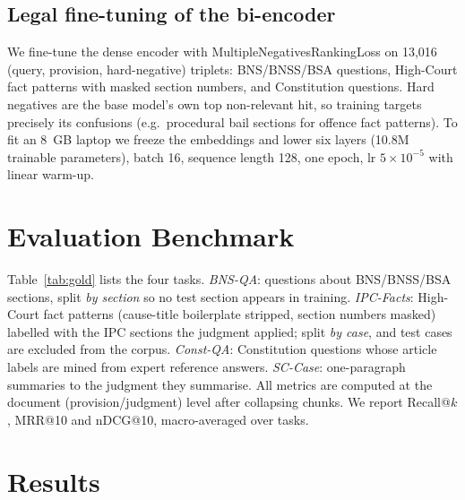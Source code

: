 \documentclass[conference]{IEEEtran}
\begin{document}
\subsection{Legal fine-tuning of the bi-encoder}
We fine-tune the dense encoder with MultipleNegativesRankingLoss on 13,016 (query, provision, hard-negative) triplets: BNS/BNSS/BSA questions, High-Court fact patterns with masked section numbers, and Constitution questions. Hard negatives are the base model's own top non-relevant hit, so training targets precisely its confusions (e.g.\ procedural bail sections for offence fact patterns). To fit an 8~GB laptop we freeze the embeddings and lower six layers (10.8M trainable parameters), batch 16, sequence length 128, one epoch, lr $5{\times}10^{-5}$ with linear warm-up.

\section{Evaluation Benchmark}
Table~\ref{tab:gold} lists the four tasks. \emph{BNS-QA}: questions about BNS/BNSS/BSA sections, split \emph{by section} so no test section appears in training. \emph{IPC-Facts}: High-Court fact patterns (cause-title boilerplate stripped, section numbers masked) labelled with the IPC sections the judgment applied; split \emph{by case}, and test cases are excluded from the corpus. \emph{Const-QA}: Constitution questions whose article labels are mined from expert reference answers. \emph{SC-Case}: one-paragraph summaries to the judgment they summarise. All metrics are computed at the document (provision/judgment) level after collapsing chunks. We report Recall@$k$, MRR@10 and nDCG@10, macro-averaged over tasks.

\section{Results}
\end{document}

